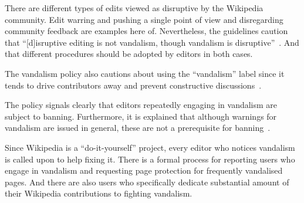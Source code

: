 
There are different types of edits viewed as disruptive by the Wikipedia community.
Edit warring and pushing a single point of view and disregarding community feedback are examples here of. %
Nevertheless, the guidelines caution that ``[d]isruptive editing is not vandalism, though vandalism is disruptive''~\cite{Wikipedia:DisruptiveEditing}.
And that different procedures should be adopted by editors in both cases.

The vandalism policy also cautions about using the ``vandalism'' label since it tends to drive contributors away and prevent constructive discussions~\cite{Wikipedia:Vandalism}.

\begin{comment}
\url{https://en.wikipedia.org/wiki/Wikipedia:Vandalism}
"Careful consideration may be required to differentiate between edits that are beneficial, edits that are detrimental but well-intentioned, and edits that are vandalism."

\url{https://en.wikipedia.org/wiki/Wikipedia:Disruptive_editing}

"Disruptive editing is not always intentional. Editors may be accidentally disruptive because they don't understand how to correctly edit, or because they lack the social skills or competence necessary to work collaboratively "
Okay what are disruptive edits that are not vandalism? (apart from edit wars)

"Engages in "disruptive cite-tagging"; adds unjustified {{citation needed}} tags to an article when the content tagged is already sourced, uses such tags to suggest that properly sourced article content is questionable."
\end{comment}


The policy signals clearly that editors repeatedly engaging in vandalism are subject to banning.
Furthermore, it is explained that although warnings for vandalism are issued in general, these are not a prerequisite for banning~\cite{Wikipedia:Vandalism}.


Since Wikipedia is a ``do-it-yourself'' project, every editor who notices vandalism is called upon to help fixing it.
There is a formal process for reporting users who engage in vandalism %
and requesting page protection for frequently vandalised pages. %
And there are also users who specifically dedicate substantial amount of their Wikipedia contributions to fighting vandalism.

